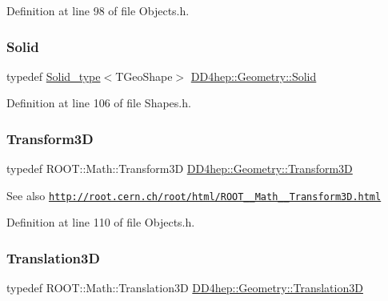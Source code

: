 Definition at line 98 of file Objects.\+h.

\hypertarget{namespace_d_d4hep_1_1_geometry_a83de90a8dcc7378ba47d54ef9a6a687b}{}\label{namespace_d_d4hep_1_1_geometry_a83de90a8dcc7378ba47d54ef9a6a687b} 
\subsubsection{\texorpdfstring{Solid}{Solid}}
{\footnotesize\ttfamily typedef \hyperlink{class_d_d4hep_1_1_geometry_1_1_solid__type}{Solid\+\_\+type}$<$T\+Geo\+Shape$>$ \hyperlink{namespace_d_d4hep_1_1_geometry_a83de90a8dcc7378ba47d54ef9a6a687b}{D\+D4hep\+::\+Geometry\+::\+Solid}}



Definition at line 106 of file Shapes.\+h.

\hypertarget{namespace_d_d4hep_1_1_geometry_aeb4c0356d12fd7be49a0aae50514e64b}{}\label{namespace_d_d4hep_1_1_geometry_aeb4c0356d12fd7be49a0aae50514e64b} 
\subsubsection{\texorpdfstring{Transform3D}{Transform3D}}
{\footnotesize\ttfamily typedef R\+O\+O\+T\+::\+Math\+::\+Transform3D \hyperlink{namespace_d_d4hep_1_1_geometry_aeb4c0356d12fd7be49a0aae50514e64b}{D\+D4hep\+::\+Geometry\+::\+Transform3D}}

\begin{DoxySeeAlso}{See also}
\href{http://root.cern.ch/root/html/ROOT__Math__Transform3D.html}{\tt http\+://root.\+cern.\+ch/root/html/\+R\+O\+O\+T\+\_\+\+\_\+\+Math\+\_\+\+\_\+\+Transform3\+D.\+html} 
\end{DoxySeeAlso}


Definition at line 110 of file Objects.\+h.

\hypertarget{namespace_d_d4hep_1_1_geometry_ab90afde486c9b46f4fa91bc659271b99}{}\label{namespace_d_d4hep_1_1_geometry_ab90afde486c9b46f4fa91bc659271b99} 
\subsubsection{\texorpdfstring{Translation3D}{Translation3D}}
{\footnotesize\ttfamily typedef R\+O\+O\+T\+::\+Math\+::\+Translation3D \hyperlink{namespace_d_d4hep_1_1_geometry_ab90afde486c9b46f4fa91bc659271b99}{D\+D4hep\+::\+Geometry\+::\+Translation3D}}

